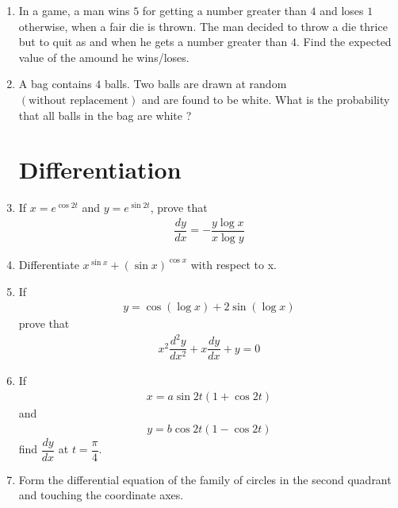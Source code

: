 \documentclass[12pt,-letter paper]{article}
\theoremstyle{remark}
\providecommand{\brak}[1]{\ensuremath{\left(#1\right)}}
\begin{document}
\begin{enumerate}
      \item In a game, a man wins \rupee $5$ for getting a number greater than $4$ and loses \rupee $1$ otherwise, when a fair die is thrown. The man decided to throw a die thrice but to quit as and when he gets a number greater than $4$. Find the expected value of the amound he wins/loses.
      \item A bag contains $4$ balls. Two balls are drawn at random \brak{\text{without replacement}} and are found to be white. What is the probability that all balls in the bag are white ?
            \section{Differentiation}
      \item If $x=e^{\cos 2t}$ and $y=e^{\sin 2t}$, prove that
            \begin{align*}
                  \dfrac{dy}{dx}= -\dfrac{y \log x}{x \log y}
            \end{align*}
      \item Differentiate $x^{\sin x}+ \brak{\sin x}^{\cos x}$ with respect to x.
      \item If
            \begin{align*}
                  y=\cos \brak{\log x} + 2 \sin \brak{\log x}
            \end{align*}
            prove that
            \begin{align*}
                  x^2 \dfrac{d^2 y}{dx^2} + x \dfrac{dy}{dx} +y =0
            \end{align*}
      \item If
            \begin{align*}
                  x=a\sin 2t\brak{1+\cos 2t}
            \end{align*}
            and
            \begin{align*}
                  y=b\cos 2t\brak{1-\cos 2t}
            \end{align*}
            find $\dfrac{dy}{dx}$ at $t=\dfrac{\pi}{4}$.
      \item Form the differential equation of the family of circles in the second quadrant and touching the coordinate axes.

\end{enumerate}
\end{document}

